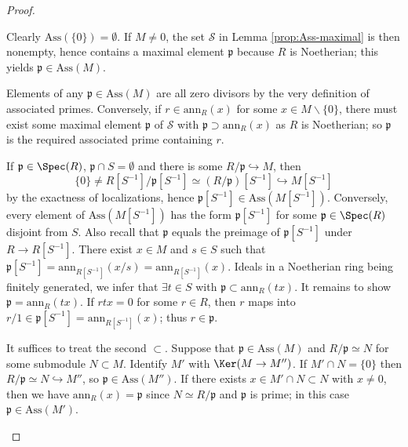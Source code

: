 \begin{proof}
	\begin{asparaenum}[(i)]
	\item Clearly $\text{Ass}(\{0\}) = \emptyset$. If $M \neq 0$, the set $\mathcal{S}$ in Lemma \ref{prop:Ass-maximal} is then nonempty, hence contains a maximal element $\mathfrak{p}$ because $R$ is Noetherian; this yields $\mathfrak{p} \in \text{Ass}(M)$.
	
	\item Elements of any $\mathfrak{p} \in \text{Ass}(M)$ are all zero divisors by the very definition of associated primes. Conversely, if $r \in \text{ann}_R(x)$ for some $x \in M \smallsetminus \{0\}$, there must exist some maximal element $\mathfrak{p}$ of $\mathcal{S}$ with $\mathfrak{p} \supset \text{ann}_R(x)$ as $R$ is Noetherian; so $\mathfrak{p}$ is the required associated prime containing $r$.
	
	\item If $\mathfrak{p} \in \Spec(R)$, $\mathfrak{p} \cap S = \emptyset$ and there is some $R/\mathfrak{p} \hookrightarrow M$, then
	\[ \{0\} \neq R[S^{-1}]/\mathfrak{p}[S^{-1}] \simeq (R/\mathfrak{p})[S^{-1}] \hookrightarrow M[S^{-1}] \]
	by the exactness of localizations, hence $\mathfrak{p}[S^{-1}] \in \text{Ass}(M[S^{-1}])$. Conversely, every element of $\text{Ass}(M[S^{-1}])$ has the form $\mathfrak{p}[S^{-1}]$ for some $\mathfrak{p} \in \Spec(R)$ disjoint from $S$. Also recall that $\mathfrak{p}$ equals the preimage of $\mathfrak{p}[S^{-1}]$ under $R \to R[S^{-1}]$. There exist $x \in M$ and $s \in S$ such that $\mathfrak{p}[S^{-1}] = \text{ann}_{R[S^{-1}]}(x/s) = \text{ann}_{R[S^{-1}]}(x)$. Ideals in a Noetherian ring being finitely generated, we infer that $\exists t \in S$ with $\mathfrak{p} \subset \text{ann}_R(tx)$. It remains to show $\mathfrak{p} = \text{ann}_R(tx)$. If $rtx=0$ for some $r \in R$, then $r$ maps into $r/1 \in \mathfrak{p}[S^{-1}] = \text{ann}_{R[S^{-1}]}(x)$; thus $r \in \mathfrak{p}$.

	\item It suffices to treat the second $\subset$. Suppose that $\mathfrak{p} \in \text{Ass}(M)$ and $R/\mathfrak{p} \simeq N$ for some submodule $N \subset M$. Identify $M'$ with $\Ker(M \to M'')$. If $M' \cap N = \{0\}$ then $R/\mathfrak{p} \simeq N \hookrightarrow M''$, so $\mathfrak{p} \in \text{Ass}(M'')$. If there exists $x \in M' \cap N \subset N$ with $x \neq 0$, then we have $\text{ann}_R(x) = \mathfrak{p}$ since $N \simeq R/\mathfrak{p}$ and $\mathfrak{p}$ is prime; in this case $\mathfrak{p} \in \text{Ass}(M')$.
	\end{asparaenum}
\end{proof}

